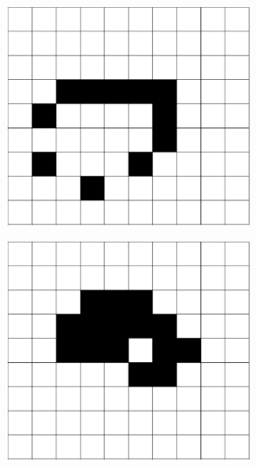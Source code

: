 \documentclass[12pt]{article}
\numberwithin{figure}{section} %
\begin{document}
\begin{figure}[H]
\begin{subfigure}{0.18\textwidth}
     \includegraphics[width=\linewidth]{Section1/6.0}
     \subcaption{}
   \end{subfigure}
     \begin{subfigure}{0.18\textwidth}
     \centering
     \includegraphics[width=\linewidth]{Section1/6.1}
     \subcaption{}
   \end{subfigure}
     \begin{subfigure}{0.18\textwidth}

\end{subfigure}
\end{figure}
\end{document}
